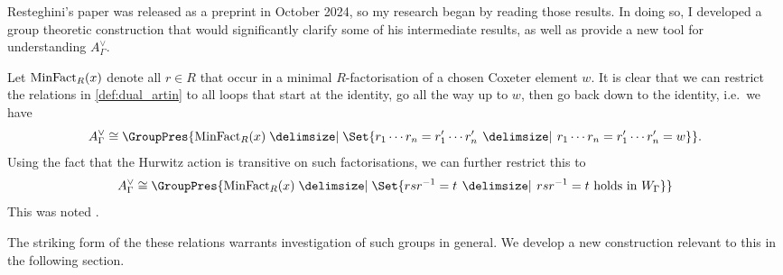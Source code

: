 Resteghini's paper \cite{resteghini_free_2024} was released as a preprint in October 2024, so my research began by reading those results.
In doing so, I developed a group theoretic construction that would significantly clarify some of his intermediate results, as well as provide a new tool for understanding $A^\vee_\Gamma$.

Let $\operatorname{MinFact}_R(x)$ denote all  $r \in R$ that occur in a minimal  $R$-factorisation of a chosen Coxeter element  $w$.
It is clear that we can restrict the relations in \cref{def:dual_artin} to all loops that start at the identity, go all the way up to $w$, then go back down to the identity, i.e.~we have
\[
	A^\vee_\Gamma \cong \GroupPres{ \minfact_R(x) \relations \Set{r_1\cdots r_n = r^\prime_1 \cdots r^\prime_n \given r_1 \cdots r_n = r^\prime_1 \cdots r^\prime_n = w}}
	.\]
Using the fact that the Hurwitz action is transitive on such factorisations, we can further restrict this to
\[
	A^\vee_\Gamma \cong \GroupPres{ \minfact_R(x) \relations \Set{rsr^{-1} = t \given rs r ^{-1} = t \text{ holds in } W_\Gamma}}
\]
This was noted \cite[Lemma 7.11]{bessis_topology_2004}.

The striking form of the these relations warrants investigation of such groups in general.
We develop a new construction relevant to this in the following section.


